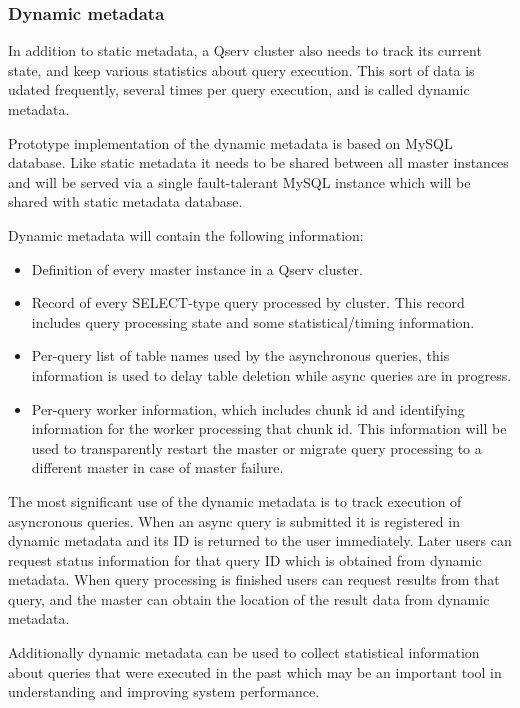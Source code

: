 \documentclass[DM,lsstdraft,toc]{lsstdoc}
\begin{document}
\subsubsection{Dynamic metadata}\label{dynamic-metadata}

In addition to static metadata, a Qserv cluster also needs to track its
current state, and keep various statistics about query execution. This
sort of data is udated frequently, several times per query execution,
and is called dynamic metadata.

Prototype implementation of the dynamic metadata is based on MySQL
database. Like static metadata it needs to be shared between all master
instances and will be served via a single fault-talerant MySQL instance
which will be shared with static metadata database.

Dynamic metadata will contain the following information:

\begin{itemize}
\item
  Definition of every master instance in a Qserv cluster.
\item
  Record of every SELECT-type query processed by cluster. This record
  includes query processing state and some statistical/timing
  information.
\item
  Per-query list of table names used by the asynchronous queries, this
  information is used to delay table deletion while async queries are in
  progress.
\item
  Per-query worker information, which includes chunk id and identifying
  information for the worker processing that chunk id. This information
  will be used to transparently restart the master or migrate query
  processing to a different master in case of master failure.
\end{itemize}

The most significant use of the dynamic metadata is to track execution
of asyncronous queries. When an async query is submitted it is
registered in dynamic metadata and its ID is returned to the user
immediately. Later users can request status information for that query
ID which is obtained from dynamic metadata. When query processing is
finished users can request results from that query, and the master can
obtain the location of the result data from dynamic metadata.

Additionally dynamic metadata can be used to collect statistical
information about queries that were executed in the past which may be an
important tool in understanding and improving system performance.
\end{document}
